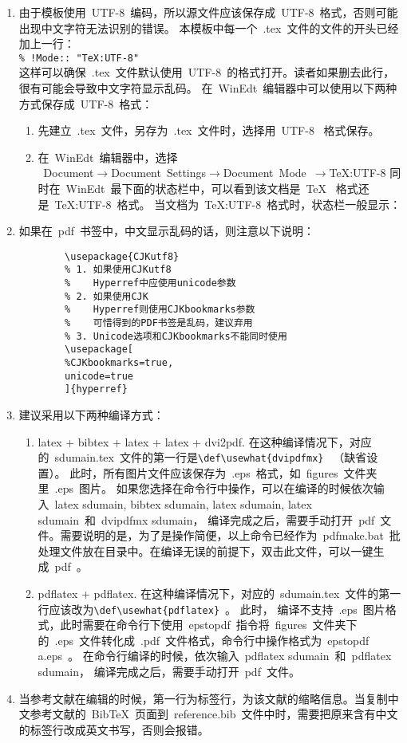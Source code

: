 \begin{enumerate}
  \item 由于模板使用~UTF-8~编码，所以源文件应该保存成~UTF-8~格式，否则可能出现中文字符无法识别的错误。
  本模板中每一个~.tex~文件的文件的开头已经加上一行：\\
  \verb|% !Mode:: "TeX:UTF-8"|\\
     这样可以确保~.tex~文件默认使用~UTF-8~的格式打开。读者如果删去此行，很有可能会导致中文字符显示乱码。
     在~WinEdt~编辑器中可以使用以下两种方式保存成~UTF-8~格式：
      \begin{enumerate}
        \item 先建立~.tex~文件，另存为~.tex~文件时，选择用~UTF-8~ 格式保存。
        \item
            在~WinEdt~编辑器中，选择\\
            \mbox{~Document$\rightarrow$Document Settings$\rightarrow$Document Mode $\rightarrow$TeX:UTF-8} 同时在~WinEdt~最下面的状态栏中，可以看到该文档是~TeX~ 格式还是~TeX:UTF-8~格式。
            当文档为~TeX:UTF-8~格式时，状态栏一般显示：
      \end{enumerate}
  \item 如果在~pdf~书签中，中文显示乱码的话，则注意以下说明：
    \begin{verbatim}
        \usepackage{CJKutf8}
        % 1. 如果使用CJKutf8
        %    Hyperref中应使用unicode参数
        % 2. 如果使用CJK
        %    Hyperref则使用CJKbookmarks参数
        %    可惜得到的PDF书签是乱码，建议弃用
        % 3. Unicode选项和CJKbookmarks不能同时使用
        \usepackage[
        %CJKbookmarks=true,
        unicode=true
        ]{hyperref}
     \end{verbatim}
  \item 建议采用以下两种编译方式：
  \begin{enumerate}
    \item latex + bibtex + latex + latex + dvi2pdf. 在这种编译情况下，对应的~sdumain.tex~文件的第一行是\verb|\def\usewhat{dvipdfmx}|~ （缺省设置）。 此时，所有图片文件应该保存为~.eps~格式，如~figures~文件夹里~.eps~图片。
          如果您选择在命令行中操作，可以在编译的时候依次输入~latex sdumain, bibtex sdumain, latex sdumain, latex sdumain~和~dvipdfmx sdumain， 编译完成之后，需要手动打开~pdf~文件。需要说明的是，为了是操作简便，以上命令已经作为~pdfmake.bat~批处理文件放在目录中。在编译无误的前提下，双击此文件，可以一键生成~pdf~。

    \item pdflatex + pdflatex. 在这种编译情况下，对应的~sdumain.tex~文件的第一行应该改为\verb|\def\usewhat{pdflatex}|~。 此时， 编译不支持~.eps~图片格式，此时需要在命令行下使用~epstopdf~指令将~figures~文件夹下 的~.eps~文件转化成~.pdf~文件格式，命令行中操作格式为~epstopdf a.eps~。
          在命令行编译的时候，依次输入~pdflatex sdumain~和~pdflatex sdumain， 编译完成之后，需要手动打开~pdf~文件。
  \end{enumerate}
    \item  当参考文献在编辑的时候，第一行为标签行，为该文献的缩略信息。当复制中文参考文献的~BibTeX~页面到~reference.bib~文件中时，需要把原来含有中文的标签行改成英文书写，否则会报错。
\end{enumerate}

